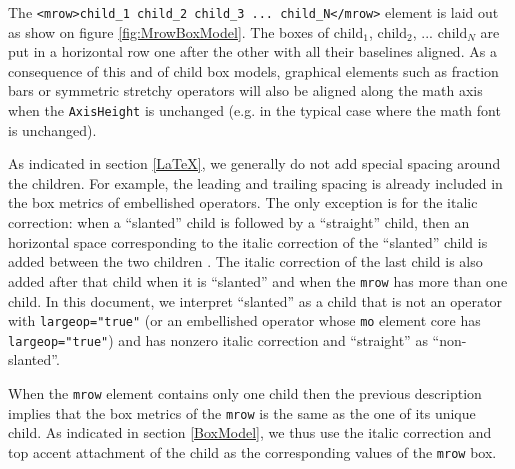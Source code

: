 The {\tt <mrow>child\_1 child\_2 child\_3 ... child\_N</mrow>} element is laid
out as show on figure \ref{fig:MrowBoxModel}. The boxes of $\text{child}_1$,
$\text{child}_2$, ... $\text{child}_N$ are put in a horizontal row
one after the other with all their baselines aligned. As a consequence of this
and of child box models, graphical elements such as fraction bars
or symmetric stretchy operators will also be
aligned along the math axis when the
{\tt AxisHeight} is unchanged (e.g. in the typical case
where the math font is unchanged).

As indicated in section \ref{LaTeX}, we generally do not add special spacing
around the children. For example, the leading and trailing spacing is already
included in the box metrics of embellished operators. The only exception is
for the italic correction: when a ``slanted'' child is
followed by a ``straight'' child, then an horizontal
space corresponding to the italic correction of the ``slanted'' child is added
between the two children \cite{OpenFontFormat3}. The italic correction of the
last child is also added after that child when it is ``slanted'' and when
the {\tt mrow} has more than one child. In this document, we interpret
``slanted'' as a child that is not an operator with
{\tt largeop="true"} (or an embellished operator whose {\tt mo} element core
has {\tt largeop="true"}) and has nonzero italic correction and ``straight''
as ``non-slanted''.

When the {\tt mrow} element contains only one child then the previous
description implies that the box metrics of the {\tt mrow} is the same as
the one of its unique child. As indicated in section \ref{BoxModel}, we thus
use the italic correction and top accent attachment of the child as the
corresponding values of the {\tt mrow} box.

